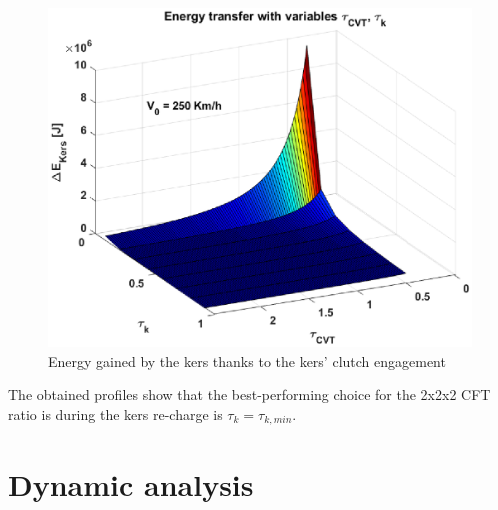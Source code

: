 \documentclass[11pt]{article}
\begin{document}
\begin{figure}[H]
\captionsetup{font=small, justification=centering}
\centering
\includegraphics[width=.7\textwidth]{Images/Results_new/Univariate_SteadyState/en_comp_dec_3D.eps}
\caption{Energy gained by the kers thanks to the kers' clutch engagement}
\label{en_comp_dec_3D}
\end{figure}  

The obtained profiles show that the best-performing choice for the 2x2x2 CFT ratio is during the kers re-charge is $\tau_k=\tau_{k,min}$.

\section{Dynamic analysis}

\newpage
\end{document}
